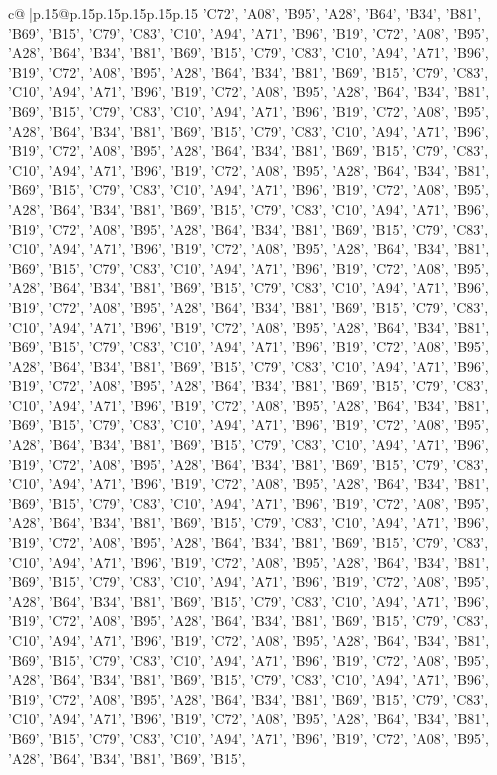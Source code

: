 \documentclass{article}
\begin{document}
{\begin{supertabular}{c@{$\;$}|p{.15\linewidth}@{}p{.15\linewidth}p{.15\linewidth}p{.15\linewidth}p{.15\linewidth}p{.15\linewidth}}
{{{{{'C72', 'A08', 'B95', 'A28', 'B64', 'B34', 'B81', 'B69', 'B15', 'C79', 'C83', 'C10', 'A94', 'A71', 'B96', 'B19', 'C72', 'A08', 'B95', 'A28', 'B64', 'B34', 'B81', 'B69', 'B15', 'C79', 'C83', 'C10', 'A94', 'A71', 'B96', 'B19', 'C72', 'A08', 'B95', 'A28', 'B64', 'B34', 'B81', 'B69', 'B15', 'C79', 'C83', 'C10', 'A94', 'A71', 'B96', 'B19', 'C72', 'A08', 'B95', 'A28', 'B64', 'B34', 'B81', 'B69', 'B15', 'C79', 'C83', 'C10', 'A94', 'A71', 'B96', 'B19', 'C72', 'A08', 'B95', 'A28', 'B64', 'B34', 'B81', 'B69', 'B15', 'C79', 'C83', 'C10', 'A94', 'A71', 'B96', 'B19', 'C72', 'A08', 'B95', 'A28', 'B64', 'B34', 'B81', 'B69', 'B15', 'C79', 'C83', 'C10', 'A94', 'A71', 'B96', 'B19', 'C72', 'A08', 'B95', 'A28', 'B64', 'B34', 'B81', 'B69', 'B15', 'C79', 'C83', 'C10', 'A94', 'A71', 'B96', 'B19', 'C72', 'A08', 'B95', 'A28', 'B64', 'B34', 'B81', 'B69', 'B15', 'C79', 'C83', 'C10', 'A94', 'A71', 'B96', 'B19', 'C72', 'A08', 'B95', 'A28', 'B64', 'B34', 'B81', 'B69', 'B15', 'C79', 'C83', 'C10', 'A94', 'A71', 'B96', 'B19', 'C72', 'A08', 'B95', 'A28', 'B64', 'B34', 'B81', 'B69', 'B15', 'C79', 'C83', 'C10', 'A94', 'A71', 'B96', 'B19', 'C72', 'A08', 'B95', 'A28', 'B64', 'B34', 'B81', 'B69', 'B15', 'C79', 'C83', 'C10', 'A94', 'A71', 'B96', 'B19', 'C72', 'A08', 'B95', 'A28', 'B64', 'B34', 'B81', 'B69', 'B15', 'C79', 'C83', 'C10', 'A94', 'A71', 'B96', 'B19', 'C72', 'A08', 'B95', 'A28', 'B64', 'B34', 'B81', 'B69', 'B15', 'C79', 'C83', 'C10', 'A94', 'A71', 'B96', 'B19', 'C72', 'A08', 'B95', 'A28', 'B64', 'B34', 'B81', 'B69', 'B15', 'C79', 'C83', 'C10', 'A94', 'A71', 'B96', 'B19', 'C72', 'A08', 'B95', 'A28', 'B64', 'B34', 'B81', 'B69', 'B15', 'C79', 'C83', 'C10', 'A94', 'A71', 'B96', 'B19', 'C72', 'A08', 'B95', 'A28', 'B64', 'B34', 'B81', 'B69', 'B15', 'C79', 'C83', 'C10', 'A94', 'A71', 'B96', 'B19', 'C72', 'A08', 'B95', 'A28', 'B64', 'B34', 'B81', 'B69', 'B15', 'C79', 'C83', 'C10', 'A94', 'A71', 'B96', 'B19', 'C72', 'A08', 'B95', 'A28', 'B64', 'B34', 'B81', 'B69', 'B15', 'C79', 'C83', 'C10', 'A94', 'A71', 'B96', 'B19', 'C72', 'A08', 'B95', 'A28', 'B64', 'B34', 'B81', 'B69', 'B15', 'C79', 'C83', 'C10', 'A94', 'A71', 'B96', 'B19', 'C72', 'A08', 'B95', 'A28', 'B64', 'B34', 'B81', 'B69', 'B15', 'C79', 'C83', 'C10', 'A94', 'A71', 'B96', 'B19', 'C72', 'A08', 'B95', 'A28', 'B64', 'B34', 'B81', 'B69', 'B15', 'C79', 'C83', 'C10', 'A94', 'A71', 'B96', 'B19', 'C72', 'A08', 'B95', 'A28', 'B64', 'B34', 'B81', 'B69', 'B15', 'C79', 'C83', 'C10', 'A94', 'A71', 'B96', 'B19', 'C72', 'A08', 'B95', 'A28', 'B64', 'B34', 'B81', 'B69', 'B15', 'C79', 'C83', 'C10', 'A94', 'A71', 'B96', 'B19', 'C72', 'A08', 'B95', 'A28', 'B64', 'B34', 'B81', 'B69', 'B15', 'C79', 'C83', 'C10', 'A94', 'A71', 'B96', 'B19', 'C72', 'A08', 'B95', 'A28', 'B64', 'B34', 'B81', 'B69', 'B15', 'C79', 'C83', 'C10', 'A94', 'A71', 'B96', 'B19', 'C72', 'A08', 'B95', 'A28', 'B64', 'B34', 'B81', 'B69', 'B15', 'C79', 'C83', 'C10', 'A94', 'A71', 'B96', 'B19', 'C72', 'A08', 'B95', 'A28', 'B64', 'B34', 'B81', 'B69', 'B15', 'C79', 'C83', 'C10', 'A94', 'A71', 'B96', 'B19', 'C72', 'A08', 'B95', 'A28', 'B64', 'B34', 'B81', 'B69', 'B15', 'C79', 'C83', 'C10', 'A94', 'A71', 'B96', 'B19', 'C72', 'A08', 'B95', 'A28', 'B64', 'B34', 'B81', 'B69', 'B15', }}}}}
\end{supertabular}}
\end{document}
